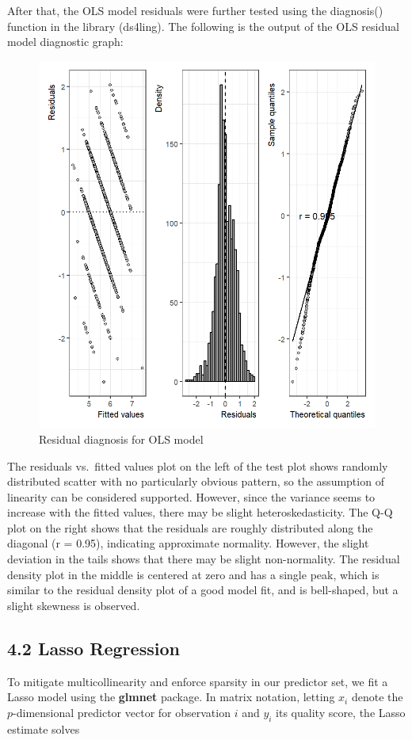 \documentclass[
  doc,floatsintext]{apa6}
\begin{document}
After that, the OLS model residuals were further tested using the diagnosis() function in the library (ds4ling). The following is the output of the OLS residual model diagnostic graph:

\begin{figure}[H]

{\centering \includegraphics[width=0.5\linewidth]{../plots/OLS_res} 

}

\caption{Residual diagnosis for OLS model}\label{fig:fig-ols-res}
\end{figure}

The residuals vs.~fitted values plot on the left of the test plot shows randomly distributed scatter with no particularly obvious pattern, so the assumption of linearity can be considered supported. However, since the variance seems to increase with the fitted values, there may be slight heteroskedasticity. The Q-Q plot on the right shows that the residuals are roughly distributed along the diagonal (r = 0.95), indicating approximate normality. However, the slight deviation in the tails shows that there may be slight non-normality. The residual density plot in the middle is centered at zero and has a single peak, which is similar to the residual density plot of a good model fit, and is bell-shaped, but a slight skewness is observed.

\subsection{4.2 Lasso Regression}\label{lasso-regression}

To mitigate multicollinearity and enforce sparsity in our predictor set, we fit a Lasso model using the \textbf{glmnet} package. In matrix notation, letting \(x_i\) denote the \(p\)-dimensional predictor vector for observation \(i\) and \(y_i\) its quality score, the Lasso estimate solves
\end{document}
